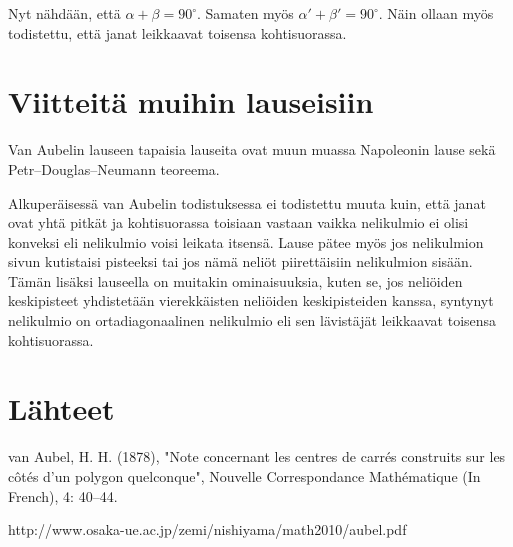 \documentclass{scrartcl}
\begin{document}
Nyt nähdään, että $\alpha + \beta = 90^\circ$. Samaten myös $\alpha' + \beta' = 90^\circ$. Näin ollaan myös todistettu, että janat leikkaavat toisensa kohtisuorassa.


\pagebreak
\section{Viitteitä muihin lauseisiin}

Van Aubelin lauseen tapaisia lauseita ovat muun muassa Napoleonin lause sekä \\Petr–Douglas–Neumann teoreema.

Alkuperäisessä van Aubelin todistuksessa ei todistettu muuta kuin, että janat ovat yhtä pitkät ja kohtisuorassa toisiaan vastaan vaikka nelikulmio ei olisi konveksi eli nelikulmio voisi leikata itsensä. Lause pätee myös jos nelikulmion sivun kutistaisi pisteeksi tai jos nämä neliöt piirettäisiin nelikulmion sisään. 
Tämän lisäksi lauseella on muitakin ominaisuuksia, kuten se, jos neliöiden keskipisteet yhdistetään vierekkäisten neliöiden keskipisteiden kanssa, syntynyt nelikulmio on ortadiagonaalinen nelikulmio eli sen lävistäjät leikkaavat toisensa kohtisuorassa.

\pagebreak
\section{Lähteet}
van Aubel, H. H. (1878), "Note concernant les centres de carrés construits sur les côtés d'un polygon quelconque", Nouvelle Correspondance Mathématique (In French), 4: 40–44.

http://www.osaka-ue.ac.jp/zemi/nishiyama/math2010/aubel.pdf
\end{document}
